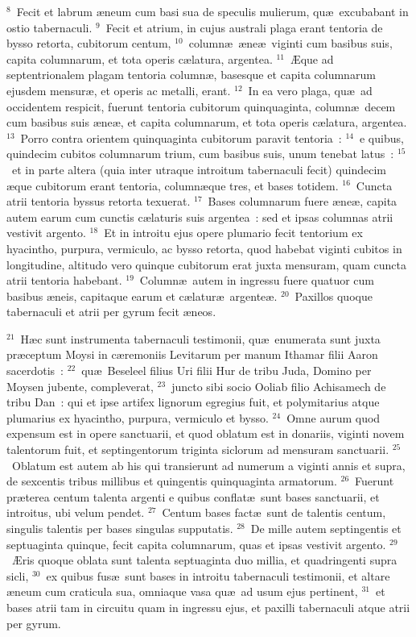 ${}^{8}$~Fecit et labrum \ae neum cum basi sua de speculis mulierum, qu\ae\ excubabant in ostio tabernaculi.
${}^{9}$~Fecit et atrium, in cujus australi plaga erant tentoria de bysso retorta, cubitorum centum,
${}^{10}$~column\ae\ \ae ne\ae\ viginti cum basibus suis, capita columnarum, et tota operis c\ae latura, argentea.
${}^{11}$~\AE que ad septentrionalem plagam tentoria column\ae , basesque et capita columnarum ejusdem mensur\ae , et operis ac metalli, erant.
${}^{12}$~In ea vero plaga, qu\ae\ ad occidentem respicit, fuerunt tentoria cubitorum quinquaginta, column\ae\ decem cum basibus suis \ae ne\ae , et capita columnarum, et tota operis c\ae latura, argentea.
${}^{13}$~Porro contra orientem quinquaginta cubitorum paravit tentoria~:
${}^{14}$~e quibus, quindecim cubitos columnarum trium, cum basibus suis, unum tenebat latus~:
${}^{15}$~et in parte altera (quia inter utraque introitum tabernaculi fecit) quindecim \ae que cubitorum erant tentoria, column\ae que tres, et bases totidem.
${}^{16}$~Cuncta atrii tentoria byssus retorta texuerat.
${}^{17}$~Bases columnarum fuere \ae ne\ae , capita autem earum cum cunctis c\ae laturis suis argentea~: sed et ipsas columnas atrii vestivit argento.
${}^{18}$~Et in introitu ejus opere plumario fecit tentorium ex hyacintho, purpura, vermiculo, ac bysso retorta, quod habebat viginti cubitos in longitudine, altitudo vero quinque cubitorum erat juxta mensuram, quam cuncta atrii tentoria habebant.
${}^{19}$~Column\ae\ autem in ingressu fuere quatuor cum basibus \ae neis, capitaque earum et c\ae latur\ae\ argente\ae .
${}^{20}$~Paxillos quoque tabernaculi et atrii per gyrum fecit \ae neos.


${}^{21}$~H\ae c sunt instrumenta tabernaculi testimonii, qu\ae\ enumerata sunt juxta pr\ae ceptum Moysi in c\ae remoniis Levitarum per manum Ithamar filii Aaron sacerdotis~:
${}^{22}$~qu\ae\ Beseleel filius Uri filii Hur de tribu Juda, Domino per Moysen jubente, compleverat,
${}^{23}$~juncto sibi socio Ooliab filio Achisamech de tribu Dan~: qui et ipse artifex lignorum egregius fuit, et polymitarius atque plumarius ex hyacintho, purpura, vermiculo et bysso.
${}^{24}$~Omne aurum quod expensum est in opere sanctuarii, et quod oblatum est in donariis, viginti novem talentorum fuit, et septingentorum triginta siclorum ad mensuram sanctuarii.
${}^{25}$~Oblatum est autem ab his qui transierunt ad numerum a viginti annis et supra, de sexcentis tribus millibus et quingentis quinquaginta armatorum.
${}^{26}$~Fuerunt pr\ae terea centum talenta argenti e quibus conflat\ae\ sunt bases sanctuarii, et introitus, ubi velum pendet.
${}^{27}$~Centum bases fact\ae\ sunt de talentis centum, singulis talentis per bases singulas supputatis.
${}^{28}$~De mille autem septingentis et septuaginta quinque, fecit capita columnarum, quas et ipsas vestivit argento.
${}^{29}$~\AE ris quoque oblata sunt talenta septuaginta duo millia, et quadringenti supra sicli,
${}^{30}$~ex quibus fus\ae\ sunt bases in introitu tabernaculi testimonii, et altare \ae neum cum craticula sua, omniaque vasa qu\ae\ ad usum ejus pertinent,
${}^{31}$~et bases atrii tam in circuitu quam in ingressu ejus, et paxilli tabernaculi atque atrii per gyrum.

